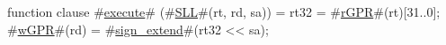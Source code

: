 function clause #\hyperref[zexecute]{execute}# (#\hyperref[zSLL]{SLL}#(rt, rd, sa)) =
  {
    rt32     = #\hyperref[zrGPR]{rGPR}#(rt)[31..0];
    #\hyperref[zwGPR]{wGPR}#(rd) = #\hyperref[zsignzyextend]{sign\_extend}#(rt32 << sa);
  }
